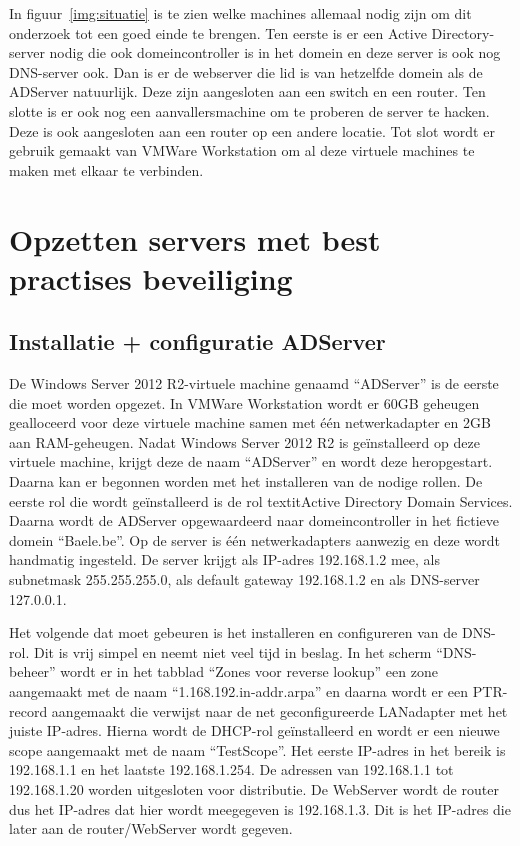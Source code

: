 \documentclass[pdftex,a4paper,12pt]{report}
\begin{document}
In figuur~\ref{img:situatie} is te zien welke machines allemaal nodig zijn om dit onderzoek tot een goed einde te brengen. Ten eerste is er een Active Directory-server nodig die ook domeincontroller is in het domein en deze server is ook nog DNS-server ook. Dan is er de webserver die lid is van hetzelfde domein als de ADServer natuurlijk. Deze zijn aangesloten aan een switch en een router. Ten slotte is er ook nog een aanvallersmachine om te proberen de server te hacken. Deze is ook aangesloten aan een router op een andere locatie. Tot slot wordt er gebruik gemaakt van VMWare Workstation om al deze virtuele machines te maken met elkaar te verbinden.

\chapter{Opzetten servers met best practises beveiliging}
\section{Installatie + configuratie ADServer}
De Windows Server 2012 R2-virtuele machine genaamd "`ADServer"' is de eerste die moet worden opgezet. In VMWare Workstation wordt er 60GB geheugen gealloceerd voor deze virtuele machine samen met één netwerkadapter en 2GB aan RAM-geheugen. Nadat Windows Server 2012 R2 is geïnstalleerd op deze virtuele machine, krijgt deze de naam "`ADServer"' en wordt deze heropgestart. Daarna kan er begonnen worden met het installeren van de nodige rollen. De eerste rol die wordt geïnstalleerd is de rol textit{Active Directory Domain Services}. Daarna wordt de ADServer opgewaardeerd naar domeincontroller in het fictieve domein "`Baele.be"'. Op de server is één netwerkadapters aanwezig en deze wordt handmatig ingesteld. De server krijgt als IP-adres 192.168.1.2 mee, als subnetmask 255.255.255.0, als default gateway 192.168.1.2 en als DNS-server 127.0.0.1. \newline

Het volgende dat moet gebeuren is het installeren en configureren van de DNS-rol. Dit is vrij simpel en neemt niet veel tijd in beslag. In het scherm "`DNS-beheer"' wordt er in het tabblad "`Zones voor reverse lookup"' een zone aangemaakt met de naam "`1.168.192.in-addr.arpa"' en daarna wordt er een PTR-record aangemaakt die verwijst naar de net geconfigureerde LANadapter met het juiste IP-adres. Hierna wordt de DHCP-rol geïnstalleerd en wordt er een nieuwe scope aangemaakt met de naam "`TestScope"'. Het eerste IP-adres in het bereik is 192.168.1.1 en het laatste 192.168.1.254. De adressen van 192.168.1.1 tot 192.168.1.20 worden uitgesloten voor distributie. De WebServer wordt de router dus het IP-adres dat hier wordt meegegeven is 192.168.1.3. Dit is het IP-adres die later aan de router/WebServer wordt gegeven. \newline
\end{document}
